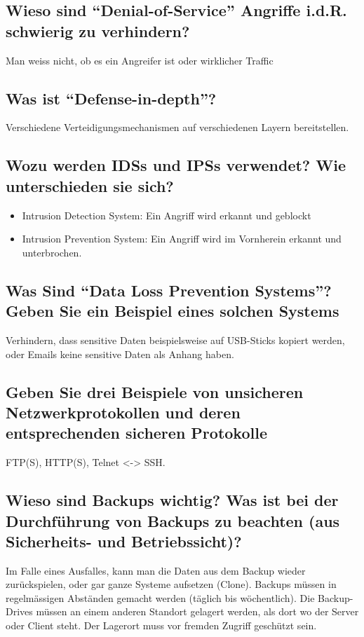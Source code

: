 \subsection*{Wieso sind "`Denial-of-Service"' Angriffe i.d.R. schwierig zu verhindern?}
Man weiss nicht, ob es ein Angreifer ist oder wirklicher Traffic

\subsection*{Was ist "`Defense-in-depth"'?}
Verschiedene Verteidigungsmechanismen auf verschiedenen Layern bereitstellen.

\subsection*{Wozu werden IDSs und IPSs verwendet? Wie unterschieden sie sich?}
\begin{itemize}
    \item Intrusion Detection System: Ein Angriff wird erkannt und geblockt
    \item Intrusion Prevention System: Ein Angriff wird im Vornherein erkannt und unterbrochen.
\end{itemize}

\subsection*{Was Sind "`Data Loss Prevention Systems"'? Geben Sie ein Beispiel eines solchen Systems}
Verhindern, dass sensitive Daten beispielsweise auf USB-Sticks kopiert werden, oder Emails keine sensitive Daten als Anhang haben.

\subsection*{Geben Sie drei Beispiele von unsicheren Netzwerkprotokollen und deren entsprechenden sicheren Protokolle}
FTP(S), HTTP(S), Telnet <-> SSH.

\subsection*{Wieso sind Backups wichtig? Was ist bei der Durchführung von Backups zu beachten (aus Sicherheits- und Betriebssicht)?}
Im Falle eines Ausfalles, kann man die Daten aus dem Backup wieder zurückspielen, oder gar ganze Systeme aufsetzen (Clone). Backups müssen in regelmässigen Abständen gemacht werden (täglich bis wöchentlich). Die Backup-Drives müssen an einem anderen Standort gelagert werden, als dort wo der Server oder Client steht. Der Lagerort muss vor fremden Zugriff geschützt sein.

